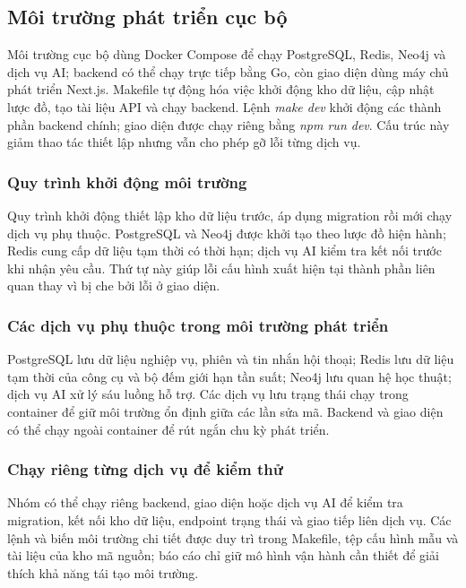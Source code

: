 \subsection{Môi trường phát triển cục bộ}

Môi trường cục bộ dùng Docker Compose để chạy PostgreSQL, Redis, Neo4j và dịch vụ AI; backend có thể chạy trực tiếp bằng Go, còn giao diện dùng máy chủ phát triển Next.js. Makefile tự động hóa việc khởi động kho dữ liệu, cập nhật lược đồ, tạo tài liệu API và chạy backend. Lệnh \textit{make dev} khởi động các thành phần backend chính; giao diện được chạy riêng bằng \textit{npm run dev}. Cấu trúc này giảm thao tác thiết lập nhưng vẫn cho phép gỡ lỗi từng dịch vụ.

\subsubsection{Quy trình khởi động môi trường}

Quy trình khởi động thiết lập kho dữ liệu trước, áp dụng migration rồi mới chạy dịch vụ phụ thuộc. PostgreSQL và Neo4j được khởi tạo theo lược đồ hiện hành; Redis cung cấp dữ liệu tạm thời có thời hạn; dịch vụ AI kiểm tra kết nối trước khi nhận yêu cầu. Thứ tự này giúp lỗi cấu hình xuất hiện tại thành phần liên quan thay vì bị che bởi lỗi ở giao diện.

\subsubsection{Các dịch vụ phụ thuộc trong môi trường phát triển}

PostgreSQL lưu dữ liệu nghiệp vụ, phiên và tin nhắn hội thoại; Redis lưu dữ liệu tạm thời của công cụ và bộ đếm giới hạn tần suất; Neo4j lưu quan hệ học thuật; dịch vụ AI xử lý sáu luồng hỗ trợ. Các dịch vụ lưu trạng thái chạy trong container để giữ môi trường ổn định giữa các lần sửa mã. Backend và giao diện có thể chạy ngoài container để rút ngắn chu kỳ phát triển.

\subsubsection{Chạy riêng từng dịch vụ để kiểm thử}

Nhóm có thể chạy riêng backend, giao diện hoặc dịch vụ AI để kiểm tra migration, kết nối kho dữ liệu, endpoint trạng thái và giao tiếp liên dịch vụ. Các lệnh và biến môi trường chi tiết được duy trì trong Makefile, tệp cấu hình mẫu và tài liệu của kho mã nguồn; báo cáo chỉ giữ mô hình vận hành cần thiết để giải thích khả năng tái tạo môi trường.

